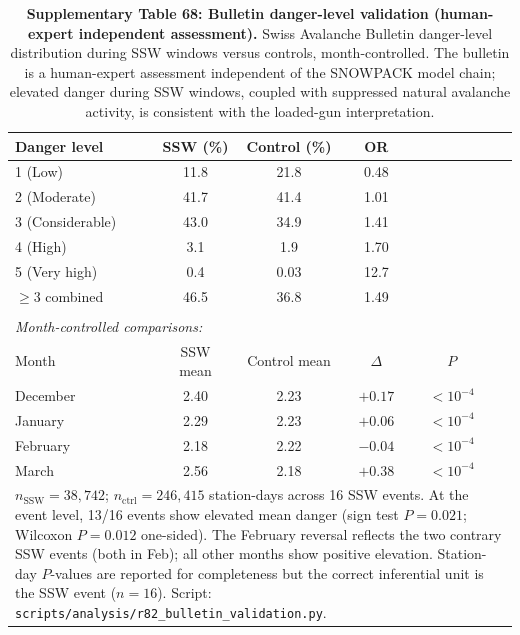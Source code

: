 \documentclass[11pt,letterpaper]{article}
\begin{document}
\begin{table}[!ht]
\centering
\caption{\textbf{Supplementary Table 68: Bulletin danger-level validation (human-expert independent assessment).}
Swiss Avalanche Bulletin danger-level distribution during SSW windows versus controls, month-controlled. The bulletin is a human-expert assessment independent of the SNOWPACK model chain; elevated danger during SSW windows, coupled with suppressed natural avalanche activity, is consistent with the loaded-gun interpretation.}
\label{tab:bulletin_validation}
\small
\begin{tabular}{lccccc}
\toprule
Danger level & SSW (\%) & Control (\%) & OR & & \\
\midrule
1 (Low) & 11.8 & 21.8 & 0.48 & & \\
2 (Moderate) & 41.7 & 41.4 & 1.01 & & \\
3 (Considerable) & 43.0 & 34.9 & 1.41 & & \\
4 (High) & 3.1 & 1.9 & 1.70 & & \\
5 (Very high) & 0.4 & 0.03 & 12.7 & & \\
\midrule
$\geq 3$ combined & 46.5 & 36.8 & 1.49 & & \\
\midrule
\multicolumn{6}{l}{} \\
\multicolumn{6}{l}{\textit{Month-controlled comparisons:}} \\
Month & SSW mean & Control mean & $\Delta$ & $P$ & \\
\midrule
December & 2.40 & 2.23 & $+0.17$ & $< 10^{-4}$ & \\
January & 2.29 & 2.23 & $+0.06$ & $< 10^{-4}$ & \\
February & 2.18 & 2.22 & $-0.04$ & $< 10^{-4}$ & \\
March & 2.56 & 2.18 & $+0.38$ & $< 10^{-4}$ & \\
\bottomrule
\multicolumn{6}{p{14cm}}{\footnotesize $n_{\mathrm{SSW}} = 38{,}742$; $n_{\mathrm{ctrl}} = 246{,}415$ station-days across 16 SSW events. At the event level, 13/16 events show elevated mean danger (sign test $P = 0.021$; Wilcoxon $P = 0.012$ one-sided). The February reversal reflects the two contrary SSW events (both in Feb); all other months show positive elevation. Station-day $P$-values are reported for completeness but the correct inferential unit is the SSW event ($n = 16$). Script: \texttt{scripts/analysis/r82\_bulletin\_validation.py}.} \\
\end{tabular}
\end{table}
\end{document}
